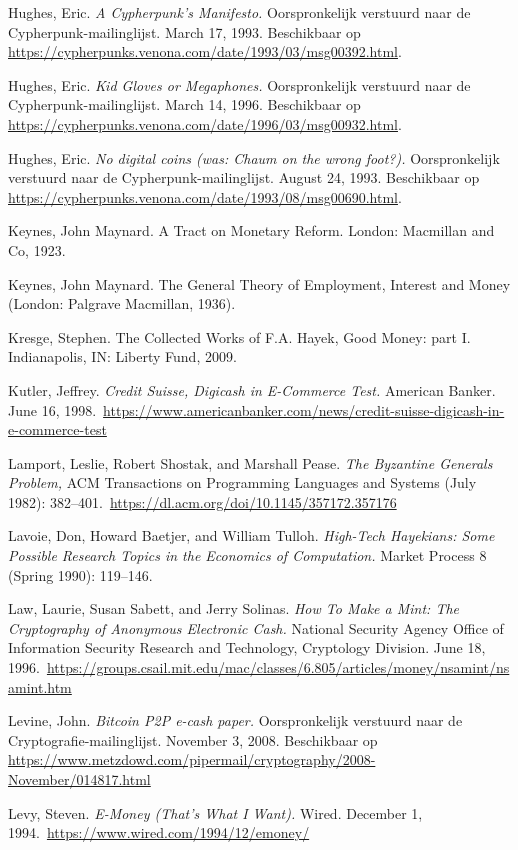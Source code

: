 \documentclass[
  a5paper,
  smalldemyvopaper,11pt,twoside,onecolumn,openright,extrafontsizes,
hidelinks]{memoir}
\begin{document}
Hughes, Eric. \emph{A Cypherpunk's Manifesto.} Oorspronkelijk verstuurd
naar de Cypherpunk-mailinglijst. March 17, 1993. Beschikbaar op
\url{https://cypherpunks.venona.com/date/1993/03/msg00392.html}.

Hughes, Eric. \emph{Kid Gloves or Megaphones.} Oorspronkelijk verstuurd
naar de Cypherpunk-mailinglijst. March 14, 1996. Beschikbaar op
\url{https://cypherpunks.venona.com/date/1996/03/msg00932.html}.

Hughes, Eric. \emph{No digital coins (was: Chaum on the wrong foot?).}
Oorspronkelijk verstuurd naar de Cypherpunk-mailinglijst. August 24,
1993. Beschikbaar op
\url{https://cypherpunks.venona.com/date/1993/08/msg00690.html}.

Keynes, John Maynard. A Tract on Monetary Reform. London: Macmillan and
Co, 1923.

Keynes, John Maynard. The General Theory of Employment, Interest and
Money (London: Palgrave Macmillan, 1936).

Kresge, Stephen. The Collected Works of F.A. Hayek, Good Money: part I.
Indianapolis, IN: Liberty Fund, 2009.

Kutler, Jeffrey. \emph{Credit Suisse, Digicash in E-Commerce Test.}
American Banker. June 16,
1998.~\url{https://www.americanbanker.com/news/credit-suisse-digicash-in-e-commerce-test}

Lamport, Leslie, Robert Shostak, and Marshall Pease. \emph{The Byzantine
Generals Problem,} ACM Transactions on Programming Languages and Systems
(July 1982):
382--401.~\url{https://dl.acm.org/doi/10.1145/357172.357176}

Lavoie, Don, Howard Baetjer, and William Tulloh. \emph{High-Tech
Hayekians: Some Possible Research Topics in the Economics of
Computation.} Market Process 8 (Spring 1990): 119--146.

Law, Laurie, Susan Sabett, and Jerry Solinas. \emph{How To Make a Mint:
The Cryptography of Anonymous Electronic Cash.} National Security Agency
Office of Information Security Research and Technology, Cryptology
Division. June 18,
1996.~\url{https://groups.csail.mit.edu/mac/classes/6.805/articles/money/nsamint/nsamint.htm}

Levine, John. \emph{Bitcoin P2P e-cash paper.} Oorspronkelijk verstuurd
naar de Cryptografie-mailinglijst. November 3, 2008. Beschikbaar op
\url{https://www.metzdowd.com/pipermail/cryptography/2008-November/014817.html}

Levy, Steven. \emph{E-Money (That's What I Want).} Wired. December 1,
1994.~\url{https://www.wired.com/1994/12/emoney/}
\end{document}
